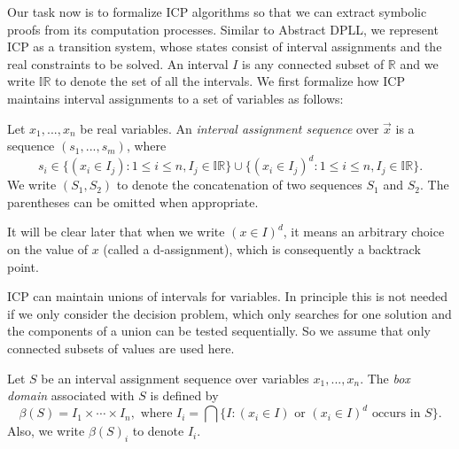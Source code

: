 \documentclass{llncs}
\begin{document}
Our task now is to formalize ICP algorithms so that we can extract symbolic proofs from its computation processes. Similar to Abstract DPLL, we represent ICP
as a transition system, whose states consist of interval assignments and the
real constraints to be solved. An interval $I$ is any connected subset of
$\mathbb{R}$ and we write $\mathbb{IR}$ to denote the set of all the intervals.
We first formalize how ICP maintains interval assignments to a set of variables
as follows:
\begin{definition}
Let $x_1,...,x_n$ be real variables. An {\em interval assignment sequence} over
$\vec x$ is a sequence $(s_1,...,s_m)$, where
$$s_i\in \{(x_i\in I_j): 1\leq i\leq n, I_j\in
\mathbb{IR}\}\cup\{(x_i\in I_j)^d: 1\leq i\leq n, I_j\in
\mathbb{IR}\}.
$$
We write $(S_1, S_2)$ to denote the concatenation of two sequences $S_1$ and
$S_2$. The parentheses can be omitted when appropriate.
\end{definition}
It will be clear later that when we write $(x\in I)^d$, it means an arbitrary
choice on the value of $x$ (called a d-assignment), which is consequently a backtrack point.
\begin{remark}
ICP can maintain unions of intervals for variables. In principle this is not
needed if we only consider the decision problem, which only searches for
one solution and the components of a union can be tested sequentially. So we
assume that only connected subsets of values are used here.
\end{remark}

\begin{definition}
Let $S$ be an interval assignment sequence over variables $x_1,...,x_n$. The
{\em box
domain} associated with $S$ is defined by
$$\beta(S) = I_1\times\cdots \times I_n, \mbox{ where }I_i = \bigcap\{ I:
(x_i\in
I)\mbox{ or } (x_i\in I)^d \mbox{ occurs in } S\}.$$
Also, we write $\beta(S)_i$ to denote $I_i$.
\end{definition}
\end{document}
